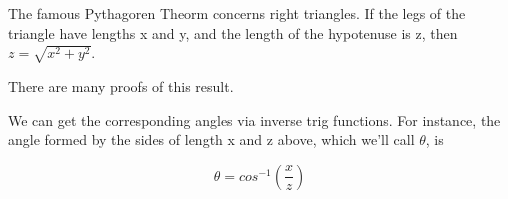 \documentclass[11pt]{article}
\begin{document}
The famous Pythagoren Theorm concerns right triangles.  If the legs of
the triangle have lengths x and y, and the length of the hypotenuse is z,
then $z = \sqrt{x^2+y^2}$.


There are many proofs of this result.

We can get the corresponding angles via inverse trig functions.  For
instance, the angle formed by the sides of length x and z above, which
we'll call $\theta$,   %
is

\begin{equation}
\theta = cos^{-1}(\frac{x}{z})  %
\end{equation}

\end{document}
